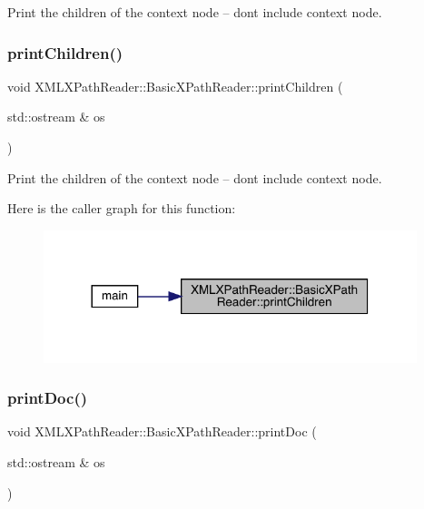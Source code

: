 Print the children of the context node -- dont include context node. 

\mbox{\label{classXMLXPathReader_1_1BasicXPathReader_a980f4e08d97855479d47e5b10205075e}} 
\subsubsection{\texorpdfstring{printChildren()}{printChildren()}\hspace{0.1cm}{\footnotesize\ttfamily [2/2]}}
{\footnotesize\ttfamily void X\+M\+L\+X\+Path\+Reader\+::\+Basic\+X\+Path\+Reader\+::print\+Children (\begin{DoxyParamCaption}\item[{std\+::ostream \&}]{os }\end{DoxyParamCaption})}



Print the children of the context node -- dont include context node. 

Here is the caller graph for this function\+:\nopagebreak
\begin{figure}[H]
\begin{center}
\leavevmode
\includegraphics[width=308pt]{d6/dbf/classXMLXPathReader_1_1BasicXPathReader_a980f4e08d97855479d47e5b10205075e_icgraph}
\end{center}
\end{figure}
\mbox{\label{classXMLXPathReader_1_1BasicXPathReader_ab4607adfbae13b0ce3c7e5b944342207}} 
\subsubsection{\texorpdfstring{printDoc()}{printDoc()}\hspace{0.1cm}{\footnotesize\ttfamily [1/2]}}
{\footnotesize\ttfamily void X\+M\+L\+X\+Path\+Reader\+::\+Basic\+X\+Path\+Reader\+::print\+Doc (\begin{DoxyParamCaption}\item[{std\+::ostream \&}]{os }\end{DoxyParamCaption})}

